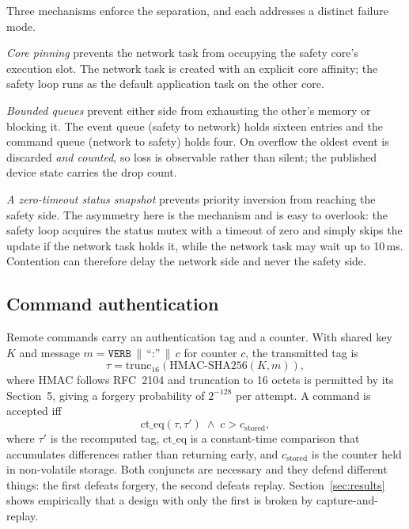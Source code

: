 Three mechanisms enforce the separation, and each addresses a distinct failure mode.

\emph{Core pinning} prevents the network task from occupying the safety core's execution slot.
The network task is created with an explicit core affinity; the safety loop runs as the default
application task on the other core.

\emph{Bounded queues} prevent either side from exhausting the other's memory or blocking it. The
event queue (safety to network) holds sixteen entries and the command queue (network to safety)
holds four. On overflow the oldest event is discarded \emph{and counted}, so loss is observable
rather than silent; the published device state carries the drop count.

\emph{A zero-timeout status snapshot} prevents priority inversion from reaching the safety side.
The asymmetry here is the mechanism and is easy to overlook: the safety loop acquires the status
mutex with a timeout of zero and simply skips the update if the network task holds it, while the
network task may wait up to 10\,ms. Contention can therefore delay the network side and never the
safety side.

\subsection{Command authentication}

Remote commands carry an authentication tag and a counter. With shared key $K$ and message
$m = \texttt{VERB}\,\|\,\text{``:''}\,\|\,c$ for counter $c$, the transmitted tag is
\begin{equation}
\tau = \mathrm{trunc}_{16}\!\left(\mathrm{HMAC\text{-}SHA256}(K, m)\right),
\label{eq:tag}
\end{equation}
where $\mathrm{HMAC}$ follows RFC~2104 and truncation to 16 octets is permitted by its
Section~5, giving a forgery probability of $2^{-128}$ per attempt. A command is accepted iff
\begin{equation}
\mathrm{ct\_eq}\!\left(\tau, \tau'\right) \;\wedge\; c > c_{\text{stored}},
\label{eq:accept}
\end{equation}
where $\tau'$ is the recomputed tag, $\mathrm{ct\_eq}$ is a constant-time comparison that
accumulates differences rather than returning early, and $c_{\text{stored}}$ is the counter held
in non-volatile storage. Both conjuncts are necessary and they defend different things: the
first defeats forgery, the second defeats replay. Section~\ref{sec:results} shows empirically
that a design with only the first is broken by capture-and-replay.

